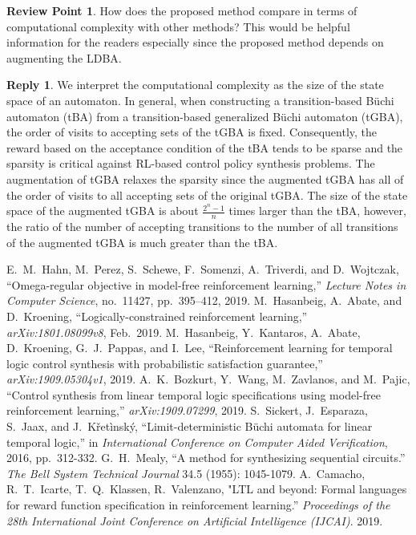 \documentclass[10 pt, dvipdfmx]{article}
\theoremstyle{definition}
\newtheorem{review point}{Review Point}[section]
\newtheorem*{reply}{Reply}
\begin{document}
\begin{review point}
  How does the proposed method compare in terms of computational
complexity with other methods? This would be helpful information for
the readers especially since the proposed method depends on augmenting
the LDBA.
\end{review point}

\begin{reply}
  We interpret the computational complexity as the size of the state space of an automaton. In general, when constructing a transition-based B\"{u}chi automaton (tBA) from a transition-based generalized B\"{u}chi automaton (tGBA), the order of visits to accepting sets of the tGBA is fixed. Consequently, the reward based on the acceptance condition of the tBA tends to be sparse and the sparsity is critical against RL-based control policy synthesis problems. The augmentation of tGBA relaxes the sparsity since the augmented tGBA has all of the order of visits to all accepting sets of the original tGBA. The size of the state space of the augmented tGBA is about $\frac{2^{n}-1}{n}$ times larger than the tBA, however, the ratio of the number of accepting transitions to the number of all transitions of the augmented tGBA is much greater than the tBA.
\end{reply}

\begin{thebibliography}{99}
E.\ M.\ Hahn, M.\ Perez, S.\ Schewe, F.\ Somenzi, A.\ Triverdi, and D.\ Wojtczak,
``Omega-regular objective in model-free reinforcement learning,''
\textit{Lecture Notes in Computer Science}, no.\ 11427, pp.\ 395--412, 2019.
M.\ Hasanbeig, A.\ Abate, and D.\ Kroening,
``Logically-constrained reinforcement learning,'' \textit{arXiv:1801.08099v8}, Feb.\ 2019.
M.\ Hasanbeig, Y.\ Kantaros, A.\ Abate, D.\ Kroening, G.\ J.\ Pappas, and I.\ Lee,
``Reinforcement learning for temporal logic control synthesis with probabilistic satisfaction guarantee,''
\textit{arXiv:1909.05304v1}, 2019.
A.\ K.\ Bozkurt, Y.\ Wang, M.\ Zavlanos, and M.\ Pajic,
``Control synthesis from linear temporal logic specifications using model-free reinforcement learning,''
\textit{arXiv:1909.07299}, 2019.
S.\ Sickert, J.\ Esparaza, S.\ Jaax, and J.\ K\v{r}et\`{i}nsk\'{y},
``Limit-deterministic B\"{u}chi automata for linear temporal logic,''
 in \textit{International Conference on Computer Aided Verification}, 2016, pp.\ 312-332.
G.\ H.\ Mealy,
``A method for synthesizing sequential circuits.''
\textit{The Bell System Technical Journal} 34.5 (1955): 1045-1079.
A.\ Camacho, R.\ T.\ Icarte, T.\ Q.\ Klassen, R.\ Valenzano,
"LTL and beyond: Formal languages for reward function specification in reinforcement learning.”
\textit{Proceedings of the 28th International Joint Conference on Artificial Intelligence (IJCAI)}. 2019.
\end{thebibliography}
\end{document}
